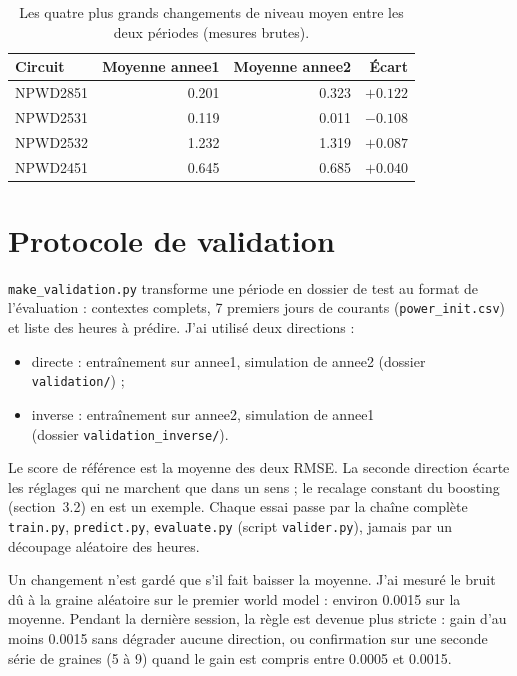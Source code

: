 \documentclass[11pt,a4paper]{article}
\newcommand{\code}[1]{\texttt{#1}}
\begin{document}
\begin{table}[!htb]
\centering\small
\caption{Les quatre plus grands changements de niveau moyen entre les deux périodes (mesures brutes).}
\label{tab:niveaux}
\begin{tabular}{l r r r}
\toprule
Circuit & Moyenne annee1 & Moyenne annee2 & Écart \\
\midrule
NPWD2851 & 0.201 & 0.323 & $+0.122$ \\
NPWD2531 & 0.119 & 0.011 & $-0.108$ \\
NPWD2532 & 1.232 & 1.319 & $+0.087$ \\
NPWD2451 & 0.645 & 0.685 & $+0.040$ \\
\bottomrule
\end{tabular}
\end{table}

\section{Protocole de validation}

\code{make\_validation.py} transforme une période en dossier de test au format de l'évaluation : contextes complets, 7 premiers jours de courants (\code{power\_init.csv}) et liste des heures à prédire. J'ai utilisé deux directions :
\begin{itemize}
  \item directe : entraînement sur annee1, simulation de annee2 (dossier \code{validation/}) ;
  \item inverse : entraînement sur annee2, simulation de annee1\\
  (dossier \code{validation\_inverse/}).
\end{itemize}
Le score de référence est la moyenne des deux RMSE. La seconde direction écarte les réglages qui ne marchent que dans un sens ; le recalage constant du boosting (section~3.2) en est un exemple. Chaque essai passe par la chaîne complète \code{train.py}, \code{predict.py}, \code{evaluate.py} (script \code{valider.py}), jamais par un découpage aléatoire des heures.

Un changement n'est gardé que s'il fait baisser la moyenne. J'ai mesuré le bruit dû à la graine aléatoire sur le premier world model : environ 0.0015 sur la moyenne. Pendant la dernière session, la règle est devenue plus stricte : gain d'au moins 0.0015 sans dégrader aucune direction, ou confirmation sur une seconde série de graines (5 à 9) quand le gain est compris entre 0.0005 et 0.0015.
\end{document}
